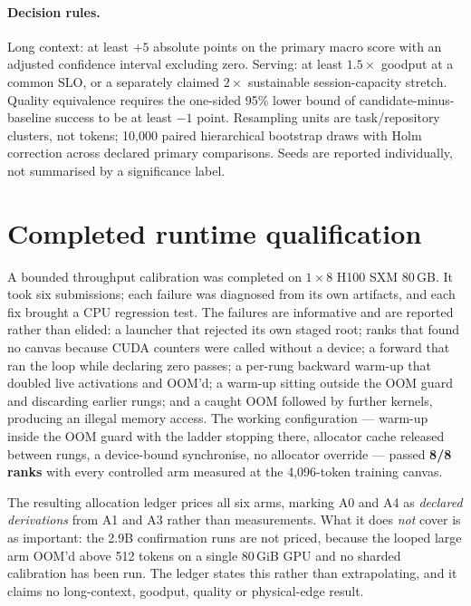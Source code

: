 \documentclass[11pt]{article}
\begin{document}
\paragraph{Decision rules.} Long context: at least $+5$ absolute points on the primary
macro score with an adjusted confidence interval excluding zero. Serving: at least
$1.5\times$ goodput at a common SLO, or a separately claimed $2\times$ sustainable
session-capacity stretch. Quality equivalence requires the one-sided 95\% lower bound of
candidate-minus-baseline success to be at least $-1$ point. Resampling units are
task/repository clusters, not tokens; 10{,}000 paired hierarchical bootstrap draws with
Holm correction across declared primary comparisons. Seeds are reported individually,
not summarised by a significance label.

\section{Completed runtime qualification}
\label{sec:runtime}

A bounded throughput calibration was completed on $1\times 8$ H100 SXM 80\,GB. It took
six submissions; each failure was diagnosed from its own artifacts, and each fix brought
a CPU regression test. The failures are informative and are reported rather than
elided: a launcher that rejected its own staged root; ranks that found no canvas because
CUDA counters were called without a device; a forward that ran the loop while declaring
zero passes; a per-rung backward warm-up that doubled live activations and OOM'd; a
warm-up sitting outside the OOM guard and discarding earlier rungs; and a caught OOM
followed by further kernels, producing an illegal memory access. The working
configuration --- warm-up inside the OOM guard with the ladder stopping there, allocator
cache released between rungs, a device-bound synchronise, no allocator override ---
passed \textbf{8/8 ranks} with every controlled arm measured at the 4{,}096-token
training canvas.

The resulting allocation ledger prices all six arms, marking A0 and A4 as \emph{declared
derivations} from A1 and A3 rather than measurements. What it does \emph{not} cover is
as important: the 2.9B confirmation runs are not priced, because the looped large arm
OOM'd above 512 tokens on a single 80\,GiB GPU and no sharded calibration has been run.
The ledger states this rather than extrapolating, and it claims no long-context,
goodput, quality or physical-edge result.
\end{document}
